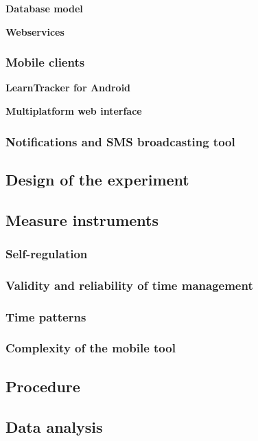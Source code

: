 \textbf{Database model}


\textbf{Webservices}


\subsubsection{Mobile clients}

\textbf{LearnTracker for Android}


\textbf{Multiplatform web interface}

\subsubsection{Notifications and SMS broadcasting tool}

\subsection{Design of the experiment}

\subsection{Measure instruments}

\subsubsection{Self-regulation}

\subsubsection{Validity and reliability of time management}

\subsubsection{Time patterns}

\subsubsection{Complexity of the mobile tool}

\subsection{Procedure}

\subsection{Data analysis}


